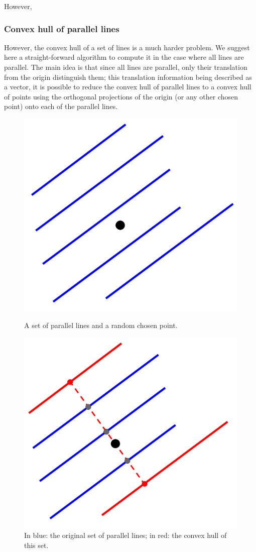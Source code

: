 However, 

\subsubsection{Convex hull of parallel lines}

However, the convex hull of a set of lines is a much harder problem. 
We suggest here a straight-forward algorithm 
to compute it in the case where all lines are parallel. The main idea is that since all lines are parallel, only 
their translation from the origin distinguish them; this translation information being described as a vector,
it is possible to reduce the convex hull of parallel lines to a convex hull of points using the orthogonal
projections of the origin (or any other chosen point) onto each of the parallel lines.

\begin{figure}[!htb]
    \begin{minipage}{0.48\textwidth}
      \centering
      \includegraphics[width=.7\linewidth]{img/zonotopes/convexHullParallelLines1.png}
      \caption{A set of parallel lines and a random chosen point.}
      \label{im:convexHullParallelLines1}
    \end{minipage}\hfill
    \begin{minipage}{0.48\textwidth}
      \centering
      \includegraphics[width=.7\linewidth]{img/zonotopes/convexHullParallelLines2.png}
      \caption{In blue: the original set of parallel lines; in red: the convex hull of this set.}
      \label{im:convexHullParallelLines3}
    \end{minipage}
 \end{figure}

